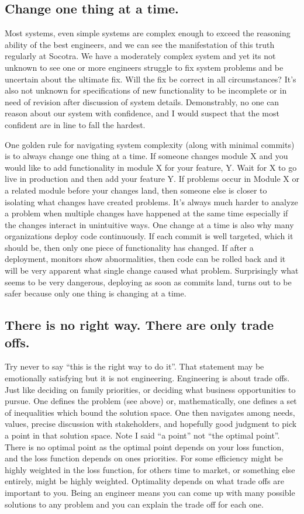 \subsection{Change one thing at a time.}
Most systems, even simple systems are complex enough to exceed the reasoning ability of the best engineers, and we can see the manifestation of this truth regularly at
Socotra. We have a moderately complex system and yet its not unknown to see one or more engineers struggle to fix system problems and
be uncertain about the ultimate fix. Will the fix be correct in all circumstances? It's also not unknown for specifications of new functionality
to be incomplete or in need of revision after discussion of system details. Demonstrably, no one can reason about our system with confidence, and
I would suspect that the most confident are in line to fall the hardest.

One golden rule for navigating system complexity (along with minimal commits) is to always change one thing at a time. If someone changes module
X and you would like to add functionality in module X for your feature, Y. Wait for X to go live in production and then add your feature Y. If
problems occur in Module X or a related module before your changes land, then someone else is closer to isolating what changes have created problems.
It's always much harder to analyze a problem when multiple changes have happened at the same time especially if the changes interact in
unintuitive ways. One change at a time is also why many organizations deploy code continuously. If each commit is well targeted, which it should
be, then only one piece of functionality has changed. If after a deployment, monitors show abnormalities, then code can be rolled back and it will
be very apparent what single change caused what problem. Surprisingly what seems to be very dangerous, deploying as soon as commits land, turns
out to be safer because only one thing is changing at a time.

\subsection{There is no right way. There are only trade offs.}
Try never to say ``this is the right way to do it''. That statement may be emotionally satisfying but it is not engineering. Engineering
is about trade offs. Just like deciding on family priorities, or deciding what business opportunities to pursue.
One defines the problem (see above) or, mathematically, one defines a set of inequalities which bound the solution space. One then navigates among needs,
values, precise discussion with stakeholders, and hopefully good judgment to pick a point in that solution space. Note I said ``a point'' not
``the optimal point''. There is no optimal point as the optimal point depends on your loss function, and the loss function depends on ones priorities.
For some efficiency might be highly weighted in the loss function, for others time to market, or something else entirely, might be highly weighted. Optimality
depends on what trade offs are important to you. Being an engineer means you
can come up with many possible solutions to any problem and you can explain the trade off for each one.

